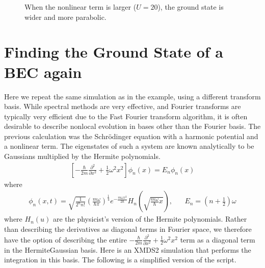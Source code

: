 \documentclass[letterpaper,10pt,english]{sphinxmanual}
\begin{document}
\begin{figure}[htbp]
\centering
\capstart

\noindent{}
\caption{When the nonlinear term is larger (\(U=20\)), the ground state is wider and more parabolic.}\label{\detokenize{worked_examples:id6}}\end{figure}


\section{Finding the Ground State of a BEC again}
\label{\detokenize{worked_examples:finding-the-ground-state-of-a-bec-again}}\label{\detokenize{worked_examples:hermitegaussgroundstatebec}}
\sphinxAtStartPar
Here we repeat the same simulation as in the {\hyperref[\detokenize{worked_examples:groundstatebec}]{}} example, using a different transform basis.  While spectral methods are very effective, and Fourier transforms are typically very efficient due to the Fast Fourier transform algorithm, it is often desirable to describe nonlocal evolution in bases other than the Fourier basis.  The previous calculation was the Schrödinger equation with a harmonic potential and a nonlinear term.  The eigenstates of such a system are known analytically to be Gaussians multiplied by the Hermite polynomials.
\begin{equation*}
\begin{split}\left[-\frac{\hbar}{2 m}\frac{\partial^2}{\partial x^2} + \frac{1}{2}\omega^2 x^2\right]\phi_n(x) = E_n \phi_n(x)\end{split}
\end{equation*}
\sphinxAtStartPar
where
\begin{equation*}
\begin{split}\phi_n(x,t) = \sqrt{\frac{1}{2^n n!}} \left(\frac{m \omega}{\hbar \pi}\right)^\frac{1}{4} e^{-\frac{m \omega x^2}{2\hbar}} H_n\left(\sqrt{\frac{m \omega}{\hbar}x}\right),\;\;\;\;\;\;E_n = \left(n+\frac{1}{2}\right) \omega\end{split}
\end{equation*}
\sphinxAtStartPar
where \(H_n(u)\) are the physicist’s version of the Hermite polynomials.  Rather than describing the derivatives as diagonal terms in Fourier space, we therefore have the option of describing the entire \(-\frac{\hbar}{2 m}\frac{\partial^2}{\partial x^2} + \frac{1}{2}\omega^2 x^2\) term as a diagonal term in the Hermite\sphinxhyphen{}Gaussian basis.  Here is an XMDS2 simulation that performs the integration in this basis. The following is a simplified version of the  script.
\end{document}
